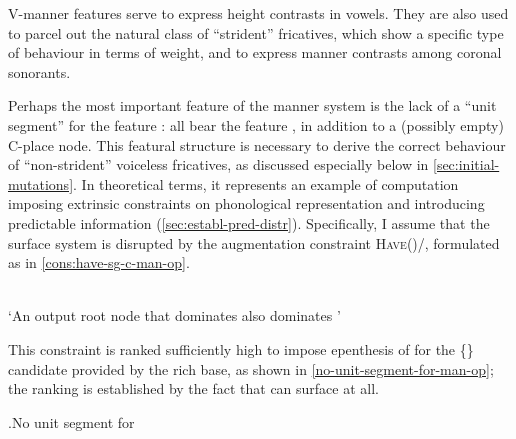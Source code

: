 V-manner features serve to express height contrasts in vowels. They are also used to parcel out the natural class of \enquote{strident} fricatives, which
show a specific type of behaviour in terms of weight, and to express manner contrasts among coronal sonorants.

Perhaps the most important feature of the manner system is the lack of a \enquote{unit segment} for the feature : all  bear the feature , in addition to a (possibly empty) C-place node. This featural structure is necessary to derive the correct behaviour of \enquote{non\hyp strident} voiceless fricatives, as discussed especially below in \cref{sec:initial-mutations}. In theoretical terms, it represents an example of computation imposing extrinsic constraints on phonological representation and introducing predictable information (\cref{sec:establ-pred-distr}). Specifically, I assume that the surface system is disrupted by the augmentation constraint \textsc{Have}\hspace{0pt}()/, formulated as in \cref{cons:have-sg-c-man-op}.

\begin{constraint}
  \label{cons:have-sg-c-man-op}
  \\
`An output root node that dominates  also dominates '
\end{constraint}


This constraint is ranked sufficiently high to impose epenthesis of  for the \{\} candidate provided by the rich base, as shown in \ref{no-unit-segment-for-man-op}; the ranking  is established by the fact that  can surface at all.

\ex.\label{no-unit-segment-for-man-op}No unit segment for \\

